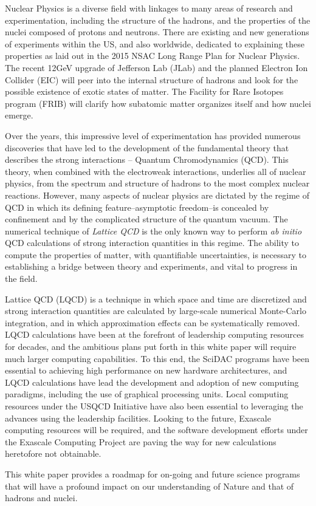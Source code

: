 
Nuclear Physics is a diverse field with linkages to many areas of
research and experimentation, including the structure of the hadrons,
and the properties of the nuclei composed of protons and neutrons.
There are existing and new generations of experiments within the US,
and also worldwide, dedicated to explaining these properties as laid
out in the 2015 NSAC Long Range Plan for Nuclear Physics.  The recent
12GeV upgrade of Jefferson Lab (JLab) and the planned Electron Ion
Collider (EIC) will peer into the internal structure of hadrons and
look for the possible existence of exotic states of matter. The
Facility for Rare Isotopes program (FRIB) will clarify how subatomic
matter organizes itself and how nuclei emerge.

Over the years, this impressive level of experimentation has provided
numerous discoveries that have led to the development of the
fundamental theory that describes the strong interactions -- Quantum
Chromodynamics (QCD). This theory, when combined with the electroweak
interactions, underlies all of nuclear physics, from the spectrum and
structure of hadrons to the most complex nuclear reactions. However,
many aspects of nuclear physics are dictated by the regime of QCD in
which its defining feature--asymptotic freedom--is concealed by
confinement and by the complicated structure of the quantum
vacuum. The numerical technique of {\it Lattice QCD} is the only known
way to perform {\it ab initio} QCD calculations of strong interaction
quantities in this regime. The ability to compute the properties of
matter, with quantifiable uncertainties, is necessary to establishing
a bridge between theory and experiments, and vital to progress in the
field.  

Lattice QCD (LQCD) is a technique in which space and time are
discretized and strong interaction quantities are calculated by
large-scale numerical Monte-Carlo integration, and in which
approximation effects can be systematically removed. LQCD calculations
have been at the forefront of leadership computing resources for
decades, and the ambitious plans put forth in this white paper will
require much larger computing capabilities. To this end, the SciDAC
programs have been essential to achieving high performance on new hardware
architectures, and LQCD calculations have lead the development and
adoption of new computing paradigms, including the use of graphical
processing units. Local computing resources under the USQCD Initiative
have also been essential to leveraging the advances using the
leadership facilities. Looking to the future, Exascale computing resources
will be required, and the software development efforts under the
Exascale Computing Project are paving the way for new calculations
heretofore not obtainable.


This white paper provides a roadmap for on-going and future science
programs that will have a profound impact on our understanding of Nature and
that of hadrons and nuclei.

